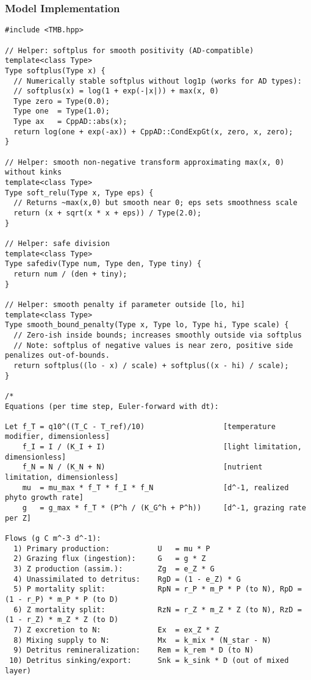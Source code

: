 \subsubsection{Model Implementation}
\begin{lstlisting}
#include <TMB.hpp>

// Helper: softplus for smooth positivity (AD-compatible)
template<class Type>
Type softplus(Type x) {
  // Numerically stable softplus without log1p (works for AD types):
  // softplus(x) = log(1 + exp(-|x|)) + max(x, 0)
  Type zero = Type(0.0);
  Type one  = Type(1.0);
  Type ax   = CppAD::abs(x);
  return log(one + exp(-ax)) + CppAD::CondExpGt(x, zero, x, zero);
}

// Helper: smooth non-negative transform approximating max(x, 0) without kinks
template<class Type>
Type soft_relu(Type x, Type eps) {
  // Returns ~max(x,0) but smooth near 0; eps sets smoothness scale
  return (x + sqrt(x * x + eps)) / Type(2.0);
}

// Helper: safe division
template<class Type>
Type safediv(Type num, Type den, Type tiny) {
  return num / (den + tiny);
}

// Helper: smooth penalty if parameter outside [lo, hi]
template<class Type>
Type smooth_bound_penalty(Type x, Type lo, Type hi, Type scale) {
  // Zero-ish inside bounds; increases smoothly outside via softplus
  // Note: softplus of negative values is near zero, positive side penalizes out-of-bounds.
  return softplus((lo - x) / scale) + softplus((x - hi) / scale);
}

/*
Equations (per time step, Euler-forward with dt):

Let f_T = q10^((T_C - T_ref)/10)                  [temperature modifier, dimensionless]
    f_I = I / (K_I + I)                           [light limitation, dimensionless]
    f_N = N / (K_N + N)                           [nutrient limitation, dimensionless]
    mu  = mu_max * f_T * f_I * f_N                [d^-1, realized phyto growth rate]
    g   = g_max * f_T * (P^h / (K_G^h + P^h))     [d^-1, grazing rate per Z]

Flows (g C m^-3 d^-1):
  1) Primary production:           U   = mu * P
  2) Grazing flux (ingestion):     G   = g * Z
  3) Z production (assim.):        Zg  = e_Z * G
  4) Unassimilated to detritus:    RgD = (1 - e_Z) * G
  5) P mortality split:            RpN = r_P * m_P * P (to N), RpD = (1 - r_P) * m_P * P (to D)
  6) Z mortality split:            RzN = r_Z * m_Z * Z (to N), RzD = (1 - r_Z) * m_Z * Z (to D)
  7) Z excretion to N:             Ex  = ex_Z * Z
  8) Mixing supply to N:           Mx  = k_mix * (N_star - N)
  9) Detritus remineralization:    Rem = k_rem * D (to N)
 10) Detritus sinking/export:      Snk = k_sink * D (out of mixed layer)


\end{lstlisting}

